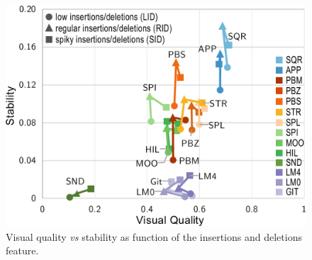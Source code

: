 \begin{figure}[h!]
    \centering
    \includegraphics[width=.7\linewidth]{figures/treemap-evaluation/insertionsDeletionsPlot}
    \caption{Visual quality \emph{vs} stability as function of the insertions and deletions feature.}
    \label{fig:insertionsDeletions}
\end{figure}




